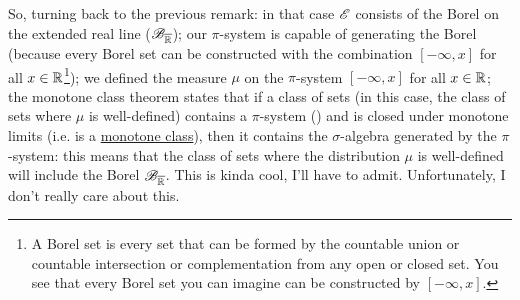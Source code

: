 \documentclass{report}
\begin{document}
So, turning back to the previous remark: in that case $\mathscr{E}$ consists of the Borel \sa{} on the extended real line ($\mathscr{B}_{\overline{\mathbb{R}}}$); our $\pi$-system is capable of generating the Borel \sa{} (because every Borel set can be constructed with the combination $[-\infty,x]$ for all $x\in\mathbb{R}$\footnote{ A Borel set is every set that can be formed by the countable union or countable intersection or complementation from any open or closed set. You see that every Borel set you can imagine can be constructed by $[-\infty,x]$.}); we defined the measure $\mu$ on the $\pi$-system $[-\infty,x]$ for all $x\in\mathbb{R}$; the monotone class theorem states that if a class of sets (in this case, the class of sets where $\mu$ is well-defined) contains a $\pi$-system (\checkmark) and is closed under monotone limits (i.e. is a \underline{monotone class}), then it contains the $\sigma$-algebra generated by the $\pi$-system: this means that the class of sets where the distribution $\mu$ is well-defined will include the Borel \sa{} $\mathscr{B}_{\overline{\mathbb{R}}}$. This is kinda cool, I'll have to admit. Unfortunately, I don't really care about this.
\end{document}
